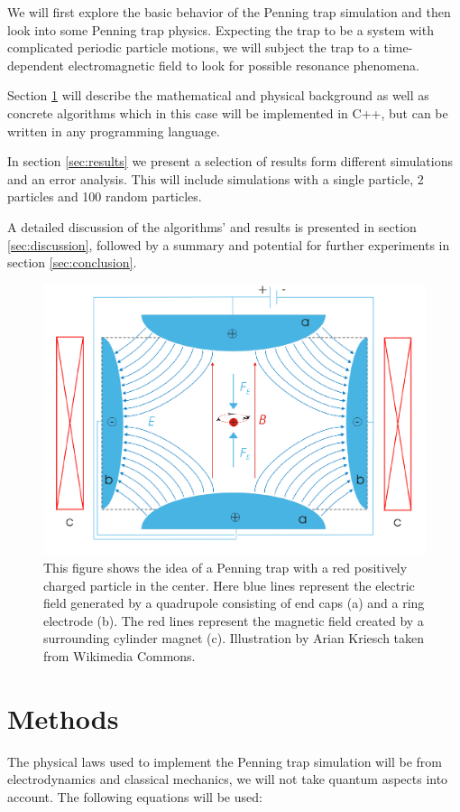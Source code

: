 \documentclass[english,notitlepage,reprint,nofootinbib]{revtex4-1}  %
\begin{document}
We will first explore the basic behavior of the Penning trap simulation and then look into some Penning trap physics. Expecting
the trap to be a system with complicated periodic particle motions, we will subject the trap to a time-dependent electromagnetic field
to look for possible resonance phenomena.


Section \ref{sec:methods} will describe the mathematical and physical background as well as concrete algorithms which in this case will be
implemented in C++, but can be written in any programming language.

In section \ref{sec:results} we present a selection of results form different simulations and an error analysis. This will include
simulations with a single particle, 2 particles and 100 random particles.

A detailed discussion of the algorithms' and results is presented in section \ref{sec:discussion},
followed by a summary and potential for further experiments in section \ref{sec:conclusion}.

\begin{figure}[H]
    \centering
    \includegraphics[width=.5\textwidth]{../figures/Penning_trap.pdf}
    \caption{This figure shows the idea of a Penning trap with a red positively charged particle in the center.
        Here blue lines represent the electric field generated by a quadrupole consisting of end caps (a) and a ring electrode (b).
        The red lines represent the magnetic field created by a surrounding cylinder magnet (c).
        Illustration by Arian Kriesch taken from Wikimedia Commons.}
    \label{fig:Penning_trap}
\end{figure}

\section{Methods}\label{sec:methods}
The physical laws used to implement the Penning trap simulation will be from electrodynamics and classical mechanics, we will not take quantum aspects into account.
The following equations will be used:
\end{document}
